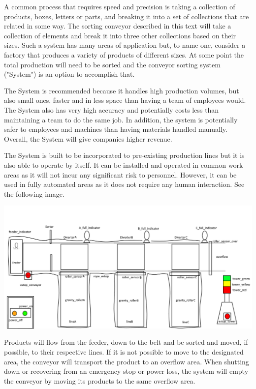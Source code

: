 A common process that requires speed and precision is taking a collection of products, boxes, letters or parts, and breaking it into a set of collections that are related in some way. The sorting conveyor described in this text will take a collection of elements and break it into three other collections based on their sizes. Such a system has many areas of application but, to name one, consider a factory that produces a variety of products of different sizes. At some point the total production will need to be sorted and the conveyor sorting system ("System") is an option to accomplish that.

The System is recommended because it handles high production volumes, but also small ones, faster and in less space than having a team of employees would. The System also has very high accuracy and potentially costs less than maintaining a team to do the same job. In addition, the system is potentially safer to employees and machines than having materials handled manually. Overall, the System will give companies higher revenue.

The System is built to be incorporated to pre-existing production lines but it is also able to operate by itself. It can be installed and operated in common work areas as it will not incur any significant risk to personnel. However, it can be used in fully automated areas as it does not require any human interaction. See the following image.

\includegraphics[scale=0.5]{../external/system_graphics_full.png}

Products will flow from the feeder, down to the belt and be sorted and moved, if possible, to their respective lines. If it is not possible to move to the designated area, the conveyor will transport the product to an overflow area. When shutting down or recovering from an emergency stop or power loss, the system will empty the conveyor by moving its products to the same overflow area.

